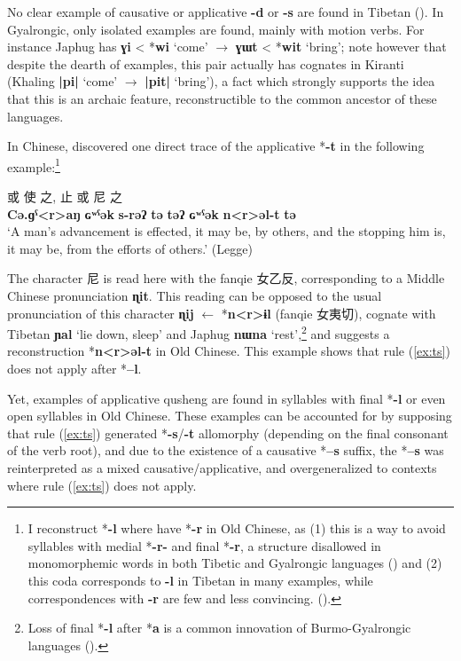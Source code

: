 \documentclass[oneside,a4paper,11pt]{article}
\newcommand{\ipa}[1]{{\phon\textbf{\mbox{#1}}}}
\newcommand{\zh}[1]{{\cn#1}}
\begin{document}
No clear example of causative or applicative \ipa{-d} or \ipa{-s} are found in Tibetan (\citealt[630]{hill14derivational}). In Gyalrongic, only isolated examples are found, mainly with motion verbs. For instance Japhug has \ipa{ɣi} < *\ipa{wi} `come' $\rightarrow$ \ipa{ɣɯt} <  *\ipa{wit} `bring'; note however that despite  the dearth of examples, this pair actually has cognates in Kiranti (Khaling \ipa{|pi|} `come' $\rightarrow$ \ipa{|pit|} `bring'), a fact which strongly supports the idea that this is an archaic feature, reconstructible to the common ancestor of these languages.

In Chinese, \citet{sagart04directions} discovered one direct trace of the applicative *\ipa{-t}  in the following example:\footnote{I reconstruct *\ipa{-l} where \citet{bs14oc} have *\ipa{-r} in Old Chinese, as (1) this is a way to avoid syllables with medial *\ipa{-r-} and final *\ipa{-r}, a structure disallowed in monomorphemic words in both Tibetic and Gyalrongic languages (\citealt{jacques04these}) and (2) this coda corresponds to \ipa{-l}  in Tibetan in many examples, while correspondences with \ipa{-r} are few and less convincing. (\citealt[101-2]{hill14jrn}).  } 

 

\begin{exe}
\ex 
\gll \zh{行} \zh{或} \zh{使} \zh{之}, \zh{止} \zh{或} \zh{尼} \zh{之} \\
 \ipa{Cə.ɡˁ<r>aŋ}  \ipa{ɢʷˁək}  \ipa{s-rəʔ}  \ipa{tə}  \ipa{təʔ}  \ipa{ɢʷˁək}  \ipa{n<r>əl-t}  \ipa{tə} \\
\glt `A man's advancement is effected, it may be, by others, and the stopping him is, it may be, from the efforts of others.' (Legge)
\end{exe}

The character \zh{尼} is read here with the fanqie \zh{女乙反}, corresponding to a Middle Chinese pronunciation \ipa{ɳit}. This reading can be opposed to the usual pronunciation of this character \ipa{ɳij} $\leftarrow$ *\ipa{n<r>ɨl}  (fanqie \zh{女夷切}), cognate with Tibetan \ipa{ɲal} `lie down, sleep' and Japhug \ipa{nɯna} `rest',\footnote{Loss of final *\ipa{-l} after *\ipa{a} is a common innovation of Burmo-Gyalrongic languages (\citealt{jacques.michaud11naish}).} and suggests a reconstruction *\ipa{n<r>əl-t} in Old Chinese. This example shows that rule (\ref{ex:ts}) does not apply after *\ipa{--l}.

 Yet, examples of  applicative qusheng are found in syllables with final *\ipa{-l} or even open syllables in Old Chinese. These examples can be accounted for by supposing that rule (\ref{ex:ts}) generated *\ipa{-s}/\ipa{-t} allomorphy (depending on the final consonant of the verb root), and due to the existence of a causative *\ipa{--s} suffix, the *\ipa{--s} was reinterpreted as a mixed causative/applicative, and overgeneralized to contexts where rule (\ref{ex:ts}) does not apply.
 
\end{document}
